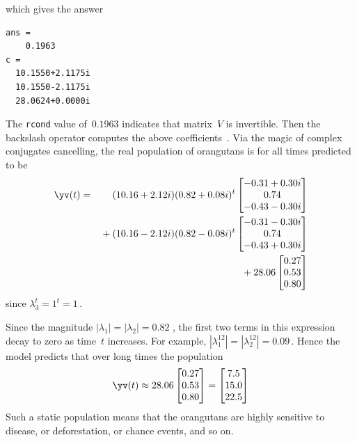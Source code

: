 \begin{example}
\begin{solution}
\begin{itemize}
which gives the answer
\begin{verbatim}
ans =
    0.1963
c =
  10.1550+2.1175i
  10.1550-2.1175i
  28.0624+0.0000i
\end{verbatim}
The \verb|rcond| value of~\(0.1963\) indicates that matrix~\(V\) is invertible.
Then the backslash operator computes the above coefficients~\cv.
Via the magic of complex conjugates cancelling, the real population of orangutans is for all times predicted to be \twodp
\begin{eqnarray*}
\yv(t)&=&(10.16+2.12i)(0.82+0.08i)^t\begin{bmatrix} -0.31+0.30i   \\0.74
\\-0.43-0.30i \end{bmatrix}
\\&&{}
+(10.16-2.12i)(0.82-0.08i)^t\begin{bmatrix} -0.31-0.30i   \\0.74
\\-0.43+0.30i \end{bmatrix}
\\&&{}
+28.06\begin{bmatrix} 0.27
\\0.53
\\0.80 \end{bmatrix}
\end{eqnarray*}
since \(\lambda_3^t=1^t=1\)\,.

Since the magnitude \(|\lambda_1|=|\lambda_2|=0.82\) \twodp, 
the first two terms in this expression decay to zero as time~\(t\) increases.
For example, \(|\lambda_1^{12}|=|\lambda_2^{12}|=0.09\)\,.
Hence the model predicts that over long times the population
\begin{equation*}
\yv(t)\approx 28.06\begin{bmatrix} 0.27
\\0.53
\\0.80 \end{bmatrix}
=\begin{bmatrix} 7.5\\15.0\\22.5 \end{bmatrix}
\end{equation*}
Such a static population means that the orangutans are highly sensitive to disease, or deforestation, or chance events, and so on.


\end{itemize}
\end{solution}
\end{example}
